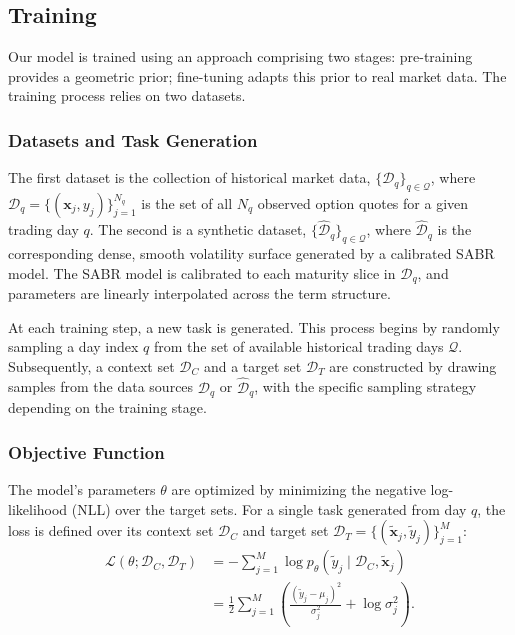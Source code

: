 \documentclass[authoryear,preprint,review,12pt]{elsarticle}
\begin{document}
\subsection{Training}
Our model is trained using an approach comprising two stages: pre-training provides a geometric prior; fine-tuning adapts this prior to real market data. The training process relies on two datasets.

\subsubsection{Datasets and Task Generation}

The first dataset is the collection of historical market data, \(\{\mathcal{D}_q\}_{q \in \mathcal{Q}}\), where \(\mathcal{D}_q = \{(\mathbf{x}_j, y_j)\}_{j=1}^{N_q}\) is the set of all \(N_q\) observed option quotes for a given trading day \(q\). The second is a synthetic dataset, \(\{\hat{\mathcal{D}}_q\}_{q \in \mathcal{Q}}\), where \(\hat{\mathcal{D}}_q\) is the corresponding dense, smooth volatility surface generated by a calibrated SABR model. The SABR model is calibrated to each maturity slice in $\mathcal{D}_q$, and parameters are linearly interpolated across the term structure.

At each training step, a new task is generated. This process begins by randomly sampling a day index \(q\) from the set of available historical trading days \(\mathcal{Q}\). Subsequently, a context set \(\mathcal{D}_{C}\) and a target set \(\mathcal{D}_{T}\) are constructed by drawing samples from the data sources \(\mathcal{D}_q\) or \(\hat{\mathcal{D}}_q\), with the specific sampling strategy depending on the training stage.

\subsubsection{Objective Function}
The model's parameters \(\theta\) are optimized by minimizing the negative log-likelihood (NLL) over the target sets. For a single task generated from day \(q\), the loss is defined over its context set \(\mathcal{D}_C\) and target set \(\mathcal{D}_T = \{(\tilde{\mathbf{x}}_j, \tilde{y}_j)\}_{j=1}^M\):
\begin{align*}
       \mathcal{L}(\theta; \mathcal{D}_C, \mathcal{D}_T) &= -\sum_{j=1}^{M} \log p_\theta(\tilde{y}_j \mid \mathcal{D}_C, \tilde{\mathbf{x}}_j) \\
       &= \frac{1}{2} \sum_{j=1}^{M} \left( \frac{(\tilde{y}_j - \mu_j)^2}{\sigma_j^2} + \log\sigma_j^2 \right).
\end{align*}
\end{document}
